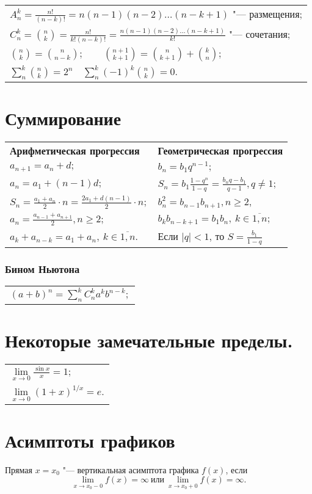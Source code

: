 \begin{longtable}[l]{l}
$A^k_n=\frac{n!}{(n-k)!}=n(n-1)(n-2)\dots(n-k+1)$ "--- размещения;
\\
$C^k_n=\binom{n}{k}=\frac{n!}{k!(n-k)!}=\frac{n(n-1)(n-2)\dots(n-k+1)}{k!}$ "--- сочетания;
\\
$\binom{n}{k}=\binom{n}{n-k};\qquad \binom{n+1}{k+1}=\binom{n}{k+1}+\binom{k}{n}; $
\\
$\sum^{k}_n \binom{n}{k}=2^n \quad \sum^{k}_n (-1)^k \binom{n}{k}=0.$
\end{longtable}

\section{Суммирование}
\begin{longtable}[l]{l l}
{\normalfont\small\sffamily\bfseries Арифметическая прогрессия}
&
{\normalfont\small\sffamily\bfseries Геометрическая прогрессия}
\\
$a_{n+1}=a_n+d;$ & $b_n=b_1 q^{n-1};$
\\
$a_n=a_1+(n-1)d;$ & $S_n=b_1\frac{1-q^n}{1-q}=\frac{b_n q-b_1}{q-1}, q\ne 1$;
\\ 
$S_n=\frac{a_1+a_n}{2}\cdot n=\frac{2a_1+d(n-1)}{2}\cdot n;$ & $b^2_n=b_{n-1}b_{n+1}, n\geq2,$
\\
$a_n=\frac{a_{n-1}+a_{n+1}}{2}, n\geq 2;$ & $b_kb_{n-k+1}=b_1b_n,\ k\in\overline{1,n};$
\\
$a_k+a_{n-k}=a_1+a_n,\ k\in\overline{1,n}.$ & Если $|q|<1$, то $S=\frac{b_1}{1-q}$
\end{longtable}

\subsubsection{Бином Ньютона}
\begin{longtable}[l]{l}
$(a+b)^n=\sum^{k}_n C^k_n a^k b^{n-k};$
\end{longtable}

\section{Некоторые замечательные пределы.}
\begin{longtable}[l]{l}
$\lim\limits_{x\to0}\frac{\sin x}{x}=1;$
\\
$\lim\limits_{x\to0} (1+x)^{1/x}=e.$
\end{longtable}

\section{Асимптоты графиков}
\textbullet \quad
Прямая $x=x_0$ "--- вертикальная асимптота графика $f(x)$, если $$\lim\limits_{x\to x_0-0}f(x)=\infty\ \text{или}\ \lim\limits_{x\to x_0+0}f(x)=\infty.$$ 

